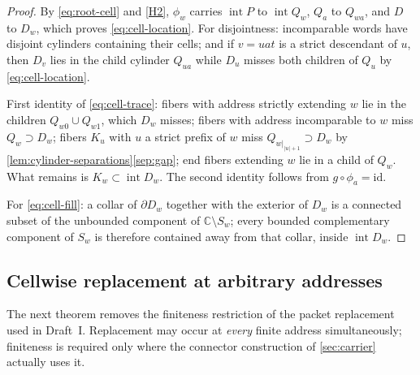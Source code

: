 \documentclass[11pt,reqno]{amsart}
\numberwithin{equation}{section}
\theoremstyle{plain}
\theoremstyle{definition}
\theoremstyle{remark}
\newcommand{\C}{\mathbb C}
\begin{document}
\begin{proof}
By \eqref{eq:root-cell} and \ref{H2}, $\phi_w$ carries
$\operatorname{int}P$ to $\operatorname{int}Q_w$, $Q_a$ to $Q_{wa}$, and
$D$ to $D_w$, which proves \eqref{eq:cell-location}.  For disjointness:
incomparable words have disjoint cylinders containing their cells; and
if $v=uat$ is a strict descendant of $u$, then $D_v$ lies in the child
cylinder $Q_{ua}$ while $D_u$ misses both children of $Q_u$ by
\eqref{eq:cell-location}.

First identity of \eqref{eq:cell-trace}: fibers with address strictly
extending $w$ lie in the children $Q_{w0}\cup Q_{w1}$, which $D_w$
misses; fibers with address incomparable to $w$ miss $Q_w\supset D_w$;
fibers $K_u$ with $u$ a strict prefix of $w$ miss
$Q_{w|_{|u|+1}}\supset D_w$ by
\cref{lem:cylinder-separations}\ref{sep:gap}; end fibers extending $w$
lie in a child of $Q_w$.  What remains is
$K_w\subset\operatorname{int}D_w$.  The second identity follows from
$g\circ\phi_a=\mathrm{id}$.

For \eqref{eq:cell-fill}: a collar of $\partial D_w$ together with the
exterior of $D_w$ is a connected subset of the unbounded component of
$\C\setminus S_w$; every bounded complementary component of $S_w$ is
therefore contained away from that collar, inside
$\operatorname{int}D_w$.
\end{proof}

\subsection{Cellwise replacement at arbitrary addresses}

The next theorem removes the finiteness restriction of the packet
replacement used in Draft~I.  Replacement may occur at \emph{every}
finite address simultaneously; finiteness is required only where the
connector construction of \cref{sec:carrier} actually uses it.
\end{document}
